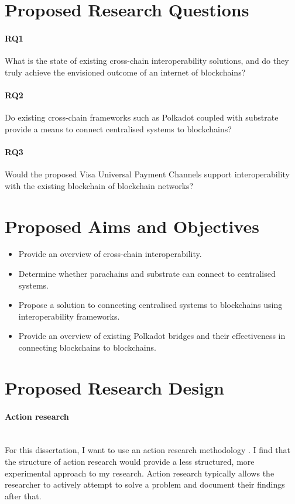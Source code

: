 \documentclass[12pt]{article}
\begin{document}
\section{Proposed Research Questions}
\paragraph{RQ1} What is the state of existing cross-chain interoperability solutions, and do they truly achieve the envisioned outcome of an internet of blockchains?
\paragraph{RQ2} Do existing cross-chain frameworks such as Polkadot coupled with substrate provide a means to connect centralised systems to blockchains?
\paragraph{RQ3} Would the proposed Visa Universal Payment Channels support interoperability with the existing blockchain of blockchain networks?

\section{Proposed Aims and Objectives}
\begin{itemize}
    \item Provide an overview of cross-chain interoperability.
    \item Determine whether parachains and substrate can connect to centralised systems.
    \item Propose a solution to connecting centralised systems to blockchains using interoperability frameworks.
    \item Provide an overview of existing Polkadot bridges and their effectiveness in connecting blockchains to blockchains.
\end{itemize}

\section{Proposed Research Design}
\paragraph{Action research}\mbox{} \\
For this dissertation, I want to use an action research methodology \autocite{10.5555/2842927}. I find that the structure of action research would provide a
less structured, more experimental approach to my research. Action research typically allows the researcher to actively attempt to solve a problem and document their findings after that.
\end{document}
